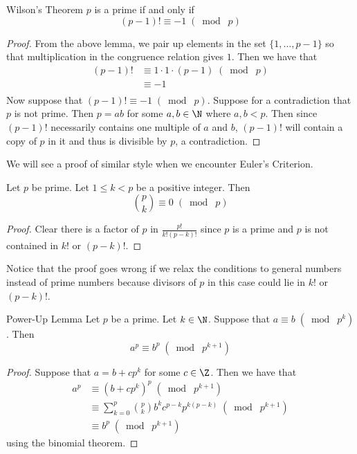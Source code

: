 \documentclass[a4paper]{article}
\begin{document}
\begin{thm}{Wilson's Theorem}{} $p$ is a prime if and only if $$(p-1)!\equiv-1\;(\bmod\;p)$$ \tcbline
\begin{proof}
From the above lemma, we pair up elements in the set $\{1,\dots,p-1\}$ so that multiplication in the congruence relation gives $1$. Then we have that 
\begin{align*}
(p-1)!&\equiv 1\cdot 1\cdot (p-1)\;(\bmod\;p)\\
&\equiv -1\\
\end{align*}
Now suppose that $(p-1)!\equiv -1\;(\bmod\;p)$. Suppose for a contradiction that $p$ is not prime. Then $p=ab$ for some $a,b\in\N$ where $a,b<p$. Then since $(p-1)!$ necessarily contains one multiple of $a$ and $b$, $(p-1)!$ will contain a copy of $p$ in it and thus is divisible by $p$, a contradiction. 
\end{proof}
\end{thm}

We will see a proof of similar style when we encounter Euler's Criterion. 

\begin{lmm}{}{} Let $p$ be prime. Let $1\leq k<p$ be a positive integer. Then $$\binom{p}{k}\equiv0\;(\bmod\;p)$$ \tcbline
\begin{proof}
Clear there is a factor of $p$ in $\frac{p!}{k!(p-k)!}$ since $p$ is a prime and $p$ is not contained in $k!$ or $(p-k)!$. 
\end{proof}
\end{lmm}

Notice that the proof goes wrong if we relax the conditions to general numbers instead of prime numbers because divisors of $p$ in this case could lie in $k!$ or $(p-k)!$. 

\begin{lmm}{Power-Up Lemma}{} Let $p$ be a prime. Let $k\in\N$. Suppose that $a\equiv b\;(\bmod\;p^k)$. Then $$a^p\equiv b^p\;(\bmod\;p^{k+1})$$ \tcbline
\begin{proof}
Suppose that $a=b+cp^k$ for some $c\in\Z$. Then we have that 
\begin{align*}
a^p&\equiv(b+cp^k)^p\;(\bmod\;p^{k+1})\\
&\equiv\sum_{k=0}^p\binom{p}{k}b^kc^{p-k}p^{k(p-k)}\;(\bmod\;p^{k+1})\\
&\equiv b^p\;(\bmod\;p^{k+1})
\end{align*}
using the binomial theorem. 
\end{proof}
\end{lmm}
\end{document}
